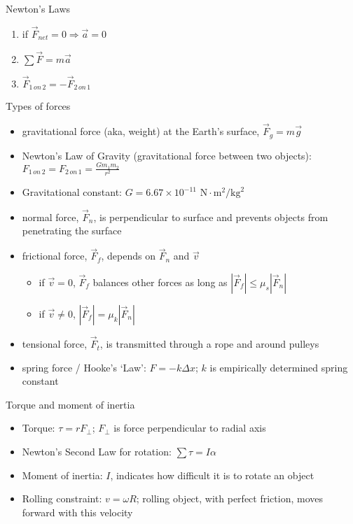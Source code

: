 \documentclass[11pt,letterpaper]{article}
\begin{document}
\noindent Newton's Laws
\begin{enumerate}
\item if $\vec{F}_{net}=0\Rightarrow \vec{a}=0$
\item $\displaystyle\sum\vec{F}=m\vec{a}$
\item $\vec{F}_{1\,on\,2}=-\vec{F}_{2\,on\,1}$
\end{enumerate}
\noindent Types of forces
\begin{itemize}
\item gravitational force (aka, weight) at the Earth's surface, $\vec{F}_g=m\vec{g}$
\item Newton's Law of Gravity (gravitational force between two objects): $F_{1\,on\,2}=F_{2\,on\,1}=\displaystyle\frac{Gm_1m_2}{r^2}$
\item Gravitational constant: $G=6.67\times{10}^{-11}\mbox{ N}\cdot\mbox{m}^2/\mbox{kg}^2$
\item normal force, $\vec{F}_n$, is perpendicular to surface and prevents objects from penetrating the surface
\item frictional force, $\vec{F}_f$, depends on $\vec{F}_n$ and $\vec{v}$
\begin{itemize}
\item if $\vec{v}=0$, $\vec{F}_f$ balances other forces as long as $\left|\vec{F}_f\right|\leq\mu_s\left|\vec{F}_n\right|$
\item if $\vec{v}\neq{0}$, $\left|\vec{F}_f\right|=\mu_k\left|\vec{F}_n\right|$
\end{itemize}
\item tensional force, $\vec{F}_t$, is transmitted through a rope and around pulleys
\item spring force / Hooke's `Law': $F=-k\Delta{x}$; $k$ is empirically determined spring constant
\end{itemize}


\noindent Torque and moment of inertia
\begin{itemize}
\item Torque: $\tau=rF_\perp$; $F_\perp$ is force perpendicular to radial axis
\item Newton's Second Law for rotation: $\sum\tau=I\alpha$
\item Moment of inertia: $I$, indicates how difficult it is to rotate an object
\item Rolling constraint: $v=\omega{R}$; rolling object, with perfect friction, moves forward with this velocity
\end{itemize}
\end{document}
